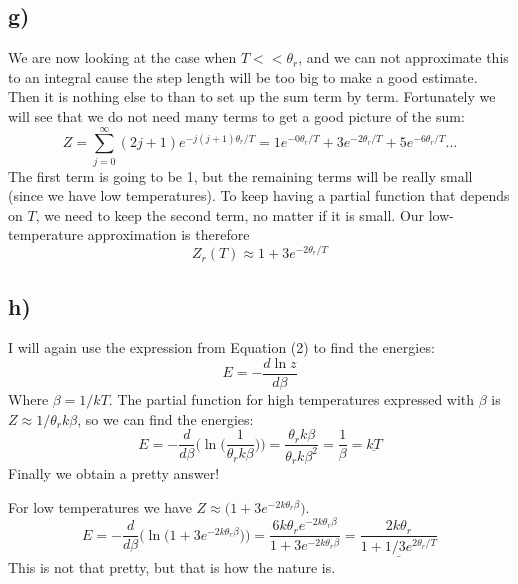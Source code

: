 \documentclass{scrartcl}
\begin{document}
\subsection*{g)}
We are now looking at the case when $T<<\theta_r$, and we can not approximate this to an integral cause the step length will be too big to make a good estimate. Then it is nothing else to than to set up the sum term by term. Fortunately we will see that we do not need many terms to get a good picture of the sum:
$$Z=\sum_{j=0}^\infty (2j+1)e^{-j(j+1)\theta_r/T}=1e^{-0\theta_r/T}+3e^{-2\theta_r/T}+5e^{-6\theta_r/T}...$$
The first term is going to be 1, but the remaining terms will be really small (since we have low temperatures). To keep having a partial function that depends on $T$, we need to keep the second term, no matter if it is small. Our low-temperature approximation is therefore
\begin{equation}
Z_r(T)\approx 1+3e^{-2\theta_r/T}
\end{equation}

\subsection*{h)}
I will again use the expression from Equation (2) to find the energies:
$$E=-\frac{d\ln z}{d\beta}$$
Where $\beta=1/kT$. The partial function for high temperatures expressed with $\beta$ is $Z\approx 1/\theta_rk\beta$, so we can find the energies:
$$E=-\frac{d}{d\beta}\Bigg(\ln\bigg(\frac{1}{\theta_rk\beta}\bigg)\Bigg)=\frac{\theta_r k\beta}{\theta_r k\beta^2}=\frac{1}{\beta}=\underline{kT}$$
Finally we obtain a pretty answer!\par\vspace{3mm}
For low temperatures we have $Z\approx\Big(1+3e^{-2k\theta_r\beta}\Big)$.
$$E=-\frac{d}{d\beta}\bigg(\ln\Big(1+3e^{-2k\theta_r\beta}\Big)\bigg) =\frac{6k\theta_re^{-2k\theta_r\beta}}{1+3e^{-2k\theta_r\beta}}=\underline{\frac{2k\theta_r}{1+1/3e^{2\theta_r/T}}}$$
This is not that pretty, but that is how the nature is.
\end{document}
